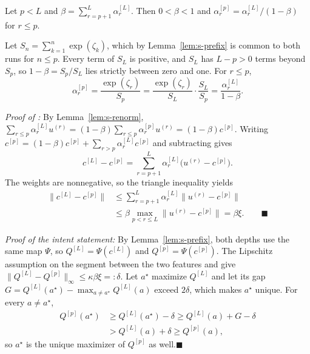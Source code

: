 \begin{lemma}[Renormalization]
\label{lem:s-renorm}
Let $p<L$ and $\beta=\sum_{r=p+1}^{L}\alpha^{[L]}_r$. Then $0<\beta<1$ and $\alpha^{[p]}_r=\alpha^{[L]}_r/(1-\beta)$ for $r\le p$.
\end{lemma}

\begin{IEEEproof}
Let $S_n=\sum_{k=1}^{n}\exp(\zeta_k)$, which by Lemma~\ref{lem:s-prefix} is common to both runs for $n\le p$. Every term of $S_L$ is positive, and $S_L$ has $L-p>0$ terms beyond $S_p$, so $1-\beta=S_p/S_L$ lies strictly between zero and one. For $r\le p$,
\begin{equation*}
\alpha^{[p]}_r=\frac{\exp(\zeta_r)}{S_p}=\frac{\exp(\zeta_r)}{S_L}\cdot\frac{S_L}{S_p}=\frac{\alpha^{[L]}_r}{1-\beta}.
\end{equation*}
\end{IEEEproof}

\noindent\textit{Proof of :} By Lemma~\ref{lem:s-renorm}, $\sum_{r\le p}\alpha^{[L]}_ru^{(r)}=(1-\beta)\sum_{r\le p}\alpha^{[p]}_ru^{(r)}=(1-\beta)c^{[p]}$. Writing $c^{[p]}=(1-\beta)c^{[p]}+\sum_{r>p}\alpha^{[L]}_rc^{[p]}$ and subtracting gives
\begin{equation}
c^{[L]}-c^{[p]}=\sum_{r=p+1}^{L}\alpha^{[L]}_r\big(u^{(r)}-c^{[p]}\big).
\label{eq:s-prefix-identity}
\end{equation}
The weights are nonnegative, so the triangle inequality yields
\begin{align*}
\big\|c^{[L]}-c^{[p]}\big\|&\le\sum_{r=p+1}^{L}\alpha^{[L]}_r\big\|u^{(r)}-c^{[p]}\big\|\\
&\le\beta\max_{p<r\le L}\big\|u^{(r)}-c^{[p]}\big\|=\beta\xi.\qquad\blacksquare
\end{align*}

\noindent\textit{Proof of the intent statement:} By Lemma~\ref{lem:s-prefix}, both depths use the same map $\Psi$, so $Q^{[L]}=\Psi(c^{[L]})$ and $Q^{[p]}=\Psi(c^{[p]})$. The Lipschitz assumption on the segment between the two features and  give $\|Q^{[L]}-Q^{[p]}\|_\infty\le\kappa\beta\xi=:\delta$. Let $a^\star$ maximize $Q^{[L]}$ and let its gap $G=Q^{[L]}(a^\star)-\max_{a\ne a^\star}Q^{[L]}(a)$ exceed $2\delta$, which makes $a^\star$ unique. For every $a\ne a^\star$,
\begin{align*}
Q^{[p]}(a^\star)&\ge Q^{[L]}(a^\star)-\delta\ge Q^{[L]}(a)+G-\delta\\
&>Q^{[L]}(a)+\delta\ge Q^{[p]}(a),
\end{align*}
so $a^\star$ is the unique maximizer of $Q^{[p]}$ as well.\hfill$\blacksquare$

